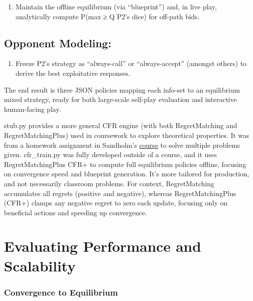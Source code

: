 \documentclass[
]{article}
\begin{document}
\begin{enumerate}
\def\labelenumi{\arabic{enumi}.}
\item
  Maintain the offline equilibrium (via ``blueprint'') and, in live
  play, analytically compute P(max ≥ Q \textbar{} P2's dice) for
  off-path bids.
\end{enumerate}

\subsection{\texorpdfstring{\textbf{Opponent Modeling}:
}{Opponent Modeling: }}\label{opponent-modeling}

\begin{enumerate}
\def\labelenumi{\arabic{enumi}.}
\setcounter{enumi}{1}
\item
  Freeze P2's strategy as ``always-call'' or ``always-accept'' (amongst
  others) to derive the best exploitative responses.
\end{enumerate}

The end result is three JSON policies mapping each info-set to an
equilibrium mixed strategy, ready for both large-scale self‑play
evaluation and interactive human-facing play.

stub.py provides a more general CFR engine (with both RegretMatching and
RegretMatchingPlus) used in coursework to explore theoretical
properties. It was from a homework assignment in Sandholm's
\href{https://www.cs.cmu.edu/~sandholm/cs15-888F23/}{\ul{course}} to
solve multiple problems given. cfr\_train.py was fully developed outside
of a course, and it uses RegretMatchingPlus CFR+ to compute full
equilibrium policies offline, focusing on convergence speed and
blueprint generation. It's more tailored for production, and not
necessarily classroom problems. For context, RegretMatching accumulates
all regrets (positive and negative), whereas RegretMatchingPlus (CFR+)
clamps any negative regret to zero each update, focusing only on
beneficial actions and speeding up convergence.

\section*{\texorpdfstring{\textbf{Evaluating Performance and
Scalability}}{Evaluating Performance and Scalability}}\label{evaluating-performance-and-scalability}

\subsubsection*{\texorpdfstring{\textbf{Convergence to
Equilibrium}}{Convergence to Equilibrium}}\label{convergence-to-equilibrium}
\end{document}
